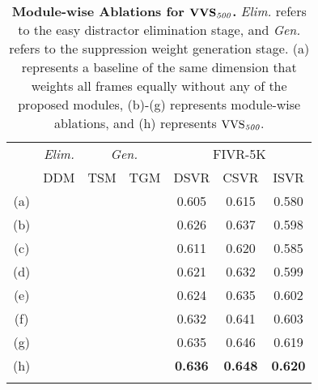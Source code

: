 \documentclass[10pt,twocolumn,letterpaper]{article}
\newcommand{\cmark}{\ding{51}}
\begin{document}
    \begin{table}[!t] \footnotesize
        \centering
        \begin{tabular}{c|ccc|ccc}
            \cmidrule[\heavyrulewidth]{1-7}
            \morecmidrules
            \cmidrule[\heavyrulewidth]{1-7}
\multicolumn{1}{c}{\multirow{2}{*}[-.3em]{$\textbf{\textup{VVS}}_{\textit{500}}$}}
            & \multicolumn{1}{|c|}{\textit{Elim.}}  & \multicolumn{2}{c|}{\textit{Gen.}} & \multicolumn{3}{c}{FIVR-5K} \\ \cmidrule(){2-7} 
           
                &\multicolumn{1}{c|}{DDM} & TSM    & TGM    & DSVR  & CSVR  & ISVR  \\ \midrule 
            (a) &       &        &        & 0.605 &	0.615 &	0.580 \\ \midrule
            (b) &\cmark &        &        & 0.626 &	0.637 &	0.598 \\ \midrule
            (c) &       & \cmark &        & 0.611 &	0.620 &	0.585 \\
            (d) &       &        & \cmark & 0.621 &	0.632 &	0.599 \\
            (e) &       & \cmark & \cmark & 0.624 &	0.635 &	0.602 \\ \midrule 
            (f) &\cmark & \cmark &        & 0.632 &	0.641 &	0.603 \\ 
            (g) &\cmark &        & \cmark & 0.635 &	0.646 &	0.619 \\ \midrule
            (h) &\cmark & \cmark & \cmark & \textbf{0.636} & \textbf{0.648} & \textbf{0.620} \\
            \cmidrule[\heavyrulewidth]{1-7}
            \morecmidrules
            \cmidrule[\heavyrulewidth]{1-7}
        \end{tabular}
        \vspace{-0mm}
        \caption{\textbf{Module-wise Ablations for $\textbf{\textup{VVS}}_{\textit{500}}$\textbf{.} }\textit{Elim.} refers to the easy distractor elimination stage, and \textit{Gen.} refers to the suppression weight generation stage. (a) represents a baseline of the same dimension that weights all frames equally without any of the proposed modules, (b)-(g) represents module-wise ablations, and (h) represents $\textup{VVS}_{\textit{500}}$. \vspace{3mm}}
        \label{tab:module_ablation500}
    \end{table}
    
\end{document}
